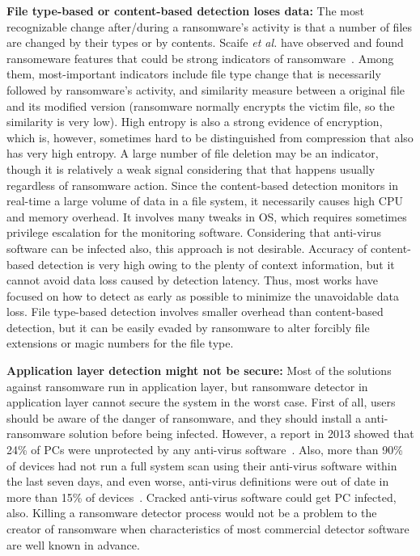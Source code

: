 \documentclass[conference]{IEEEtran}
\newcommand{\etal}{{\it et al.}\xspace}
\begin{document}


{\noindent\bf File type-based or content-based detection loses data:} 
The most recognizable change after/during 
a ransomware's activity is that a number of files are changed by their types or by contents. 
Scaife \etal have observed and found ransomeware features that could be strong indicators 
of ransomware~\cite{scaife16}.
Among them, most-important indicators include file type change that is necessarily followed by
ransomware's activity, and similarity measure between a original file and its modified
version (ransomware normally encrypts the victim file, so the similarity is very low).
High entropy is also a strong evidence of encryption, which is, however, sometimes hard to be distinguished
from compression that also has very high entropy. A large number of file deletion may be an indicator, though
it is relatively a weak signal considering that that happens usually regardless of ransomware action. 
Since the content-based detection monitors in real-time a large volume of data in a file system, 
it necessarily causes high CPU and memory overhead. It involves many tweaks in OS,
which requires sometimes privilege escalation for the monitoring software. 
Considering that anti-virus software can be infected also, this approach is not desirable.
Accuracy of content-based detection is very high owing to the plenty of context information, 
but it cannot avoid data loss caused by detection latency. Thus, most works have focused on 
how to detect as early as possible to minimize the unavoidable data loss. 
File type-based detection involves smaller overhead than content-based detection, 
but it can be easily evaded by ransomware to alter forcibly file extensions or magic numbers for the file type.

{\noindent\bf Application layer detection might not be secure:}
Most of the solutions against ransomware run in application layer, 
but ransomware detector in application layer cannot secure the system in the worst case.
First of all, users should be aware of the danger of ransomware, 
and they should install a anti-ransomware solution before being infected. 
However, a report in 2013 showed that 24\% of PCs were unprotected by any anti-virus software~\cite{unprotected}. 
Also, more than 90\% of devices had not run a full system scan using their anti-virus software 
within the last seven days, and even worse, anti-virus definitions were out of date in more than 15\% 
of devices~\cite{antivirus}. Cracked anti-virus software could get PC infected, also.
Killing a ransomware detector process would not be a problem to the creator
of ransomware when characteristics of most commercial detector software are well known in advance.
\end{document}
